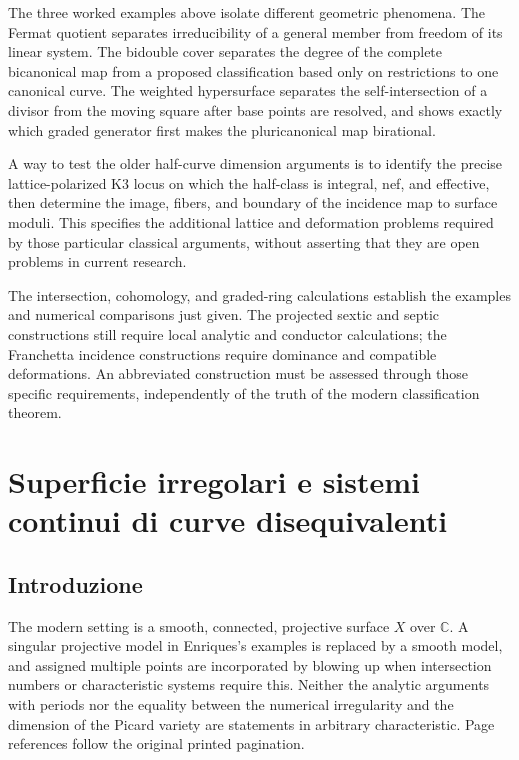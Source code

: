 \begin{remark}
\label{cp2-viii-limits}
The three worked examples above isolate different geometric phenomena. The Fermat quotient separates irreducibility of a general member from freedom of its linear system. The bidouble cover separates the degree of the complete bicanonical map from a proposed classification based only on restrictions to one canonical curve. The weighted hypersurface separates the self-intersection of a divisor from the moving square after base points are resolved, and shows exactly which graded generator first makes the pluricanonical map birational.

A way to test the older half-curve dimension arguments is to identify the precise lattice-polarized K3 locus on which the half-class is integral, nef, and effective, then determine the image, fibers, and boundary of the incidence map to surface moduli. This specifies the additional lattice and deformation problems required by those particular classical arguments, without asserting that they are open problems in current research.

The intersection, cohomology, and graded-ring calculations establish the examples and numerical comparisons just given. The projected sextic and septic constructions still require local analytic and conductor calculations; the Franchetta incidence constructions require dominance and compatible deformations. An abbreviated construction must be assessed through those specific requirements, independently of the truth of the modern classification theorem.
\end{remark}


\chapter[Superficie irregolari e sistemi continui]{Superficie irregolari e sistemi continui di curve disequivalenti}\label{cp2-ix}




\section{Introduzione}\label{cp2-ix-1}

The modern setting is a smooth, connected, projective surface \(X\) over \(\mathbb C\). A singular projective model in Enriques's examples is replaced by a smooth model, and assigned multiple points are incorporated by blowing up when intersection numbers or characteristic systems require this. Neither the analytic arguments with periods nor the equality between the numerical irregularity and the dimension of the Picard variety are statements in arbitrary characteristic. Page references follow the original printed pagination.

